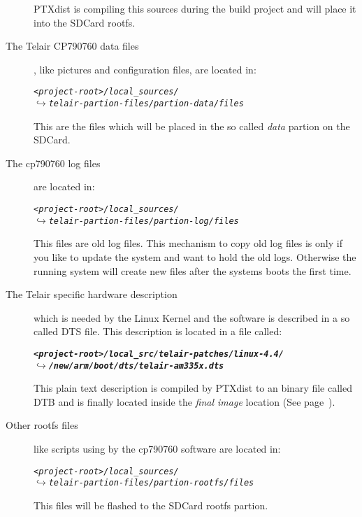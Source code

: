 \begin{description}
        PTXdist is compiling this sources during the build project and will
        place it into the SDCard rootfs.

    \item[The Telair CP790760 data files], like pictures and configuration files,
        are located in:
        \begin{alltt}
        \textit{<project-root>/local\_sources/
        \qquad\(\hookrightarrow\) telair-partion-files/partion-data/files}
        \end{alltt}
        This are the files which will be placed in the so called \textit{data}
        partion on the SDCard.

    \item[The cp790760 log files] are located in:
        \begin{alltt}
        \textit{<project-root>/local\_sources/
        \qquad\(\hookrightarrow\) telair-partion-files/partion-log/files}
        \end{alltt}
        This files are old log files. This mechanism to copy old log files is
        only if you like to update the system and want to hold the old logs.
        Otherwise the running system will create new files after the systems
        boots the first time.

    \item[The Telair specific hardware description] which is needed by the Linux
        Kernel and the software is described in a so called \gls{DTS} file.
        This description is located in a file called:

        \begin{alltt}
        \textit{\textbf{<project-root>/local\_src/telair-patches/linux-4.4/
        \qquad\(\hookrightarrow\) /new/arm/boot/dts/telair-am335x.dts}}
        \end{alltt}
        This plain text description is compiled by PTXdist to an binary file
        called \gls{DTB} and is finally located inside the \textit{final image}
        location (See page~\pageref{part:location_finalimage}).

    \item[Other rootfs files] like scripts using by the cp790760 software are
        located in:

        \begin{alltt}
        \textit{<project-root>/local\_sources/
        \qquad\(\hookrightarrow\) telair-partion-files/partion-rootfs/files}
        \end{alltt}
        This files will be flashed to the SDCard rootfs partion.


\end{description}
